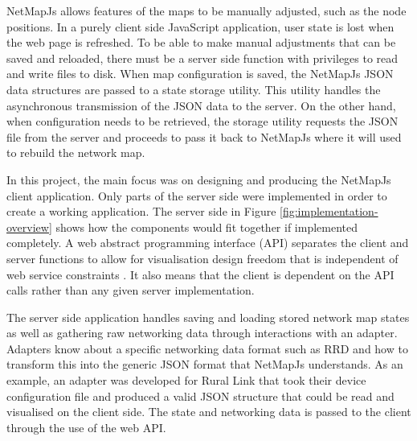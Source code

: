 \documentclass[11pt, a4paper]{article}
\begin{document}
NetMapJs allows features of the maps to be manually adjusted, such as the node
positions. In a purely client side JavaScript application, user state is lost
when the web page is refreshed. To be able to make manual adjustments that can
be saved and reloaded, there must be a server side function with privileges to
read and write files to disk. When map configuration is saved, the NetMapJs JSON
data structures are passed to a state storage utility. This utility handles the
asynchronous transmission of the JSON data to the server. On the other hand,
when configuration needs to be retrieved, the storage utility requests the JSON
file from the server and proceeds to pass it back to NetMapJs where it will used
to rebuild the network map.

In this project, the main focus was on designing and producing the NetMapJs
client application. Only parts of the server side were implemented in order to
create a working application. The server side in Figure
\ref{fig:implementation-overview} shows how the components would fit together if
implemented completely. A web abstract programming interface (API) separates the
client and server functions to allow for visualisation design freedom that is
independent of web service constraints \cite{Wood_2008}. It also means that the
client is dependent on the API calls rather than any given server implementation.

The server side application handles saving and loading stored network map states
as well as gathering raw networking data through interactions with an adapter.
Adapters know about a specific networking data format such as RRD and how to
transform this into the generic JSON format that NetMapJs understands. As an
example, an adapter was developed for Rural Link that took their device
configuration file and produced a valid JSON structure that could be read and
visualised on the client side. The state and networking data is passed to the
client through the use of the web API.
\end{document}

